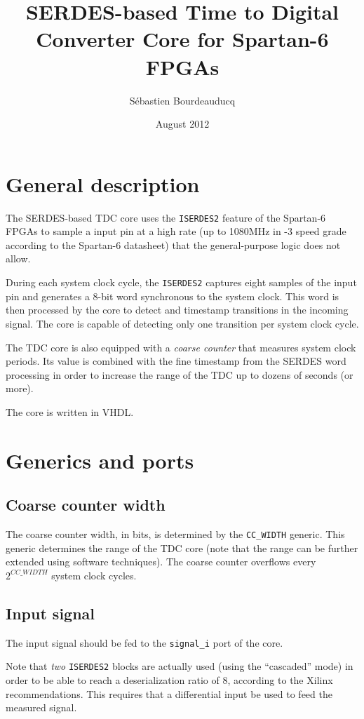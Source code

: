 \documentclass[a4paper,11pt]{article}
\title{SERDES-based Time to Digital Converter Core for Spartan-6 FPGAs}
\author{S\'ebastien Bourdeauducq}
\date{August 2012}
\begin{document}
\setlength{\parindent}{0pt}
\setlength{\parskip}{5pt}
\maketitle{}
\section{General description}
The SERDES-based TDC core uses the \verb!ISERDES2! feature of the Spartan-6 FPGAs to sample a input pin at a high rate (up to 1080MHz in -3 speed grade according to the Spartan-6 datasheet) that the general-purpose logic does not allow.

During each system clock cycle, the \verb!ISERDES2! captures eight samples of the input pin and generates a 8-bit word synchronous to the system clock. This word is then processed by the core to detect and timestamp transitions in the incoming signal. The core is capable of detecting only one transition per system clock cycle.

The TDC core is also equipped with a \textit{coarse counter} that measures system clock periods. Its value is combined with the fine timestamp from the SERDES word processing in order to increase the range of the TDC up to dozens of seconds (or more).

The core is written in VHDL.

\section{Generics and ports}

\subsection{Coarse counter width}
The coarse counter width, in bits, is determined by the \verb!CC_WIDTH! generic. This generic determines the range of the TDC core (note that the range can be further extended using software techniques). The coarse counter overflows every $2^{CC\_WIDTH}$ system clock cycles.

\subsection{Input signal}
The input signal should be fed to the \verb!signal_i! port of the core.

Note that \textit{two} \verb!ISERDES2! blocks are actually used (using the ``cascaded'' mode) in order to be able to reach a deserialization ratio of 8, according to the Xilinx recommendations. This requires that a differential input be used to feed the measured signal.
\end{document}
